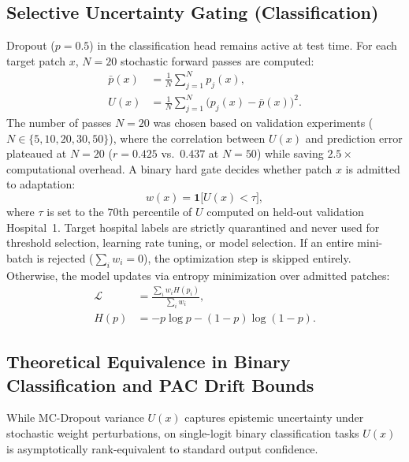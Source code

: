 \documentclass[journal]{IEEEtran}
\begin{document}
\subsection{Selective Uncertainty Gating (Classification)}
Dropout ($p=0.5$) in the classification head remains active at test time. For each target patch $x$, $N=20$ stochastic forward passes are computed:
\begin{equation}
\label{eq:mc_dropout}
\begin{aligned}
\bar{p}(x) &= \frac{1}{N} \sum_{j=1}^N p_j(x), \\
U(x) &= \frac{1}{N} \sum_{j=1}^N \bigl(p_j(x) - \bar{p}(x)\bigr)^2.
\end{aligned}
\end{equation}
The number of passes $N=20$ was chosen based on validation experiments ($N \in \{5, 10, 20, 30, 50\}$), where the correlation between $U(x)$ and prediction error plateaued at $N=20$ ($r=0.425$ vs.\ $0.437$ at $N=50$) while saving $2.5\times$ computational overhead. A binary hard gate decides whether patch $x$ is admitted to adaptation:
\begin{equation}
\label{eq:gating}
w(x) = \mathbf{1}\bigl[U(x) < \tau\bigr],
\end{equation}
where $\tau$ is set to the 70th percentile of $U$ computed on held-out validation Hospital~1. Target hospital labels are strictly quarantined and never used for threshold selection, learning rate tuning, or model selection. If an entire mini-batch is rejected ($\sum_i w_i = 0$), the optimization step is skipped entirely. Otherwise, the model updates via entropy minimization over admitted patches:
\begin{equation}
\label{eq:entropy_loss}
\begin{aligned}
\mathcal{L} &= \frac{\sum_i w_i H(p_i)}{\sum_i w_i}, \\
H(p) &= -p \log p - (1-p) \log (1-p).
\end{aligned}
\end{equation}

\subsection{Theoretical Equivalence in Binary Classification and PAC Drift Bounds}
\label{sec:theory}
While MC-Dropout variance $U(x)$ captures epistemic uncertainty under stochastic weight perturbations, on single-logit binary classification tasks $U(x)$ is asymptotically rank-equivalent to standard output confidence.
\end{document}
